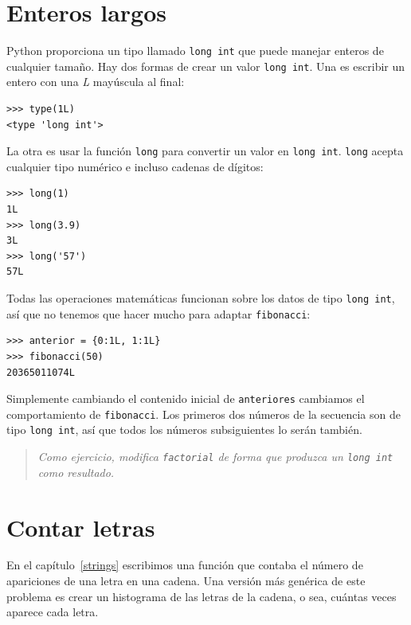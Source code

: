 \section{Enteros largos}

Python proporciona un tipo llamado \texttt{long int} que puede manejar enteros de cualquier tamaño. Hay dos formas de crear un valor \texttt{long int}. Una es escribir un entero con una {\em L} mayúscula al final:

\beforeverb
\begin{verbatim}
>>> type(1L)
<type 'long int'>
\end{verbatim}
\afterverb
%
La otra es usar la función \texttt{long} para convertir un valor en \texttt{long int}. \texttt{long} acepta cualquier tipo numérico e incluso cadenas de dígitos:

\beforeverb
\begin{verbatim}
>>> long(1)
1L
>>> long(3.9)
3L
>>> long('57')
57L
\end{verbatim}
\afterverb
%
Todas las operaciones matemáticas funcionan sobre los datos de tipo \texttt{long int}, 
así que no tenemos que hacer mucho para adaptar \texttt{fibonacci}:

\beforeverb
\begin{verbatim}
>>> anterior = {0:1L, 1:1L}
>>> fibonacci(50)
20365011074L
\end{verbatim}
\afterverb
%
Simplemente cambiando el contenido inicial de \texttt{anteriores} cambiamos el comportamiento de \texttt{fibonacci}. Los primeros dos números de la secuencia son de tipo  \texttt{long int}, así que todos los números subsiguientes lo serán también.


\begin{quote}
{\em Como ejercicio, modifica \texttt{factorial} de forma que produzca un \texttt{long int} como resultado.}
\end{quote}


\section{Contar letras}

En el capítulo~\ref{strings} escribimos una función que contaba el número de apariciones de una letra en una cadena. Una versión más genérica de este problema es crear un histograma de las letras de la cadena, o sea, cuántas veces aparece cada letra.

